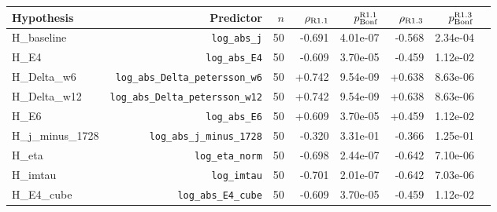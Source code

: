 \begin{tabular}{lrrrrrrr}
\hline
Hypothesis & Predictor & $n$ & $\rho_{\rm R1.1}$ & $p_{\rm Bonf}^{\rm R1.1}$ & $\rho_{\rm R1.3}$ & $p_{\rm Bonf}^{\rm R1.3}$ \\
\hline
H\_baseline & \texttt{log\_abs\_j} & 50 & -0.691 & 4.01e-07 & -0.568 & 2.34e-04 \\
H\_E4 & \texttt{log\_abs\_E4} & 50 & -0.609 & 3.70e-05 & -0.459 & 1.12e-02 \\
H\_Delta\_w6 & \texttt{log\_abs\_Delta\_petersson\_w6} & 50 & +0.742 & 9.54e-09 & +0.638 & 8.63e-06 \\
H\_Delta\_w12 & \texttt{log\_abs\_Delta\_petersson\_w12} & 50 & +0.742 & 9.54e-09 & +0.638 & 8.63e-06 \\
H\_E6 & \texttt{log\_abs\_E6} & 50 & +0.609 & 3.70e-05 & +0.459 & 1.12e-02 \\
H\_j\_minus\_1728 & \texttt{log\_abs\_j\_minus\_1728} & 50 & -0.320 & 3.31e-01 & -0.366 & 1.25e-01 \\
H\_eta & \texttt{log\_eta\_norm} & 50 & -0.698 & 2.44e-07 & -0.642 & 7.10e-06 \\
H\_imtau & \texttt{log\_imtau} & 50 & -0.701 & 2.01e-07 & -0.642 & 7.03e-06 \\
H\_E4\_cube & \texttt{log\_abs\_E4\_cube} & 50 & -0.609 & 3.70e-05 & -0.459 & 1.12e-02 \\
\hline
\end{tabular}
